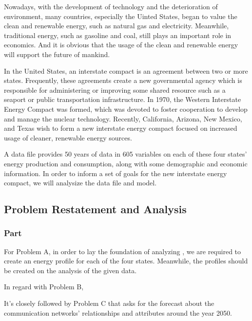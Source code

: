 \documentclass[a4paper,11pt]{article}
\begin{document}
\par Nowadays, with the development of technology and the deterioration of environment, many countries, especially the Uinted States, began to value the clean and renewable energy, such as natural gas and electricity. Meanwhile, traditional energy, such as gasoline and coal, still plays an important role in economics. And it is obvious that the usage of the clean and renewable energy will support the future of mankind.
\par In the United States, an interstate compact is an agreement between two or more states. Frequently, these agreements create a new governmental agency which is responsible for administering or improving some shared resource such as a seaport or public transportation infrastructure.\cite{1} In 1970, the Western Interstate Energy Compact was formed, which was devoted to foster cooperation to develop and manage the nuclear technology. Recently, California, Arizona, New Mexico, and Texas wish to form a new interstate energy compact focused on increased usage of cleaner, renewable energy sources. 
\par A data file provides 50 years of data in 605 variables on each of these four states' energy production and consumption, along with some demographic and economic information. In order to inform a set of goals for the new interstate energy compact, we will analysize the data file and model.





\subsection{Problem Restatement and Analysis}
\subsubsection{Part \uppercase\expandafter{}}
\par For Problem A, in order to lay the foundation of analyzing , we are required to create an energy profile for each of the four states. Meanwhile, the profiles should be created on the analysis of the given data.

\par In regard with Problem B, 

\par It's closely followed by Problem C that asks for the forecast about the communication networks' relationships and attributes around the year 2050. 
\end{document}
